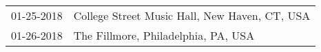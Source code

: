\begin{supertabular}{ll}
 01-25-2018 &  College Street Music Hall, New Haven, CT, USA \\
 01-26-2018 &            The Fillmore, Philadelphia, PA, USA \\
\end{supertabular}
